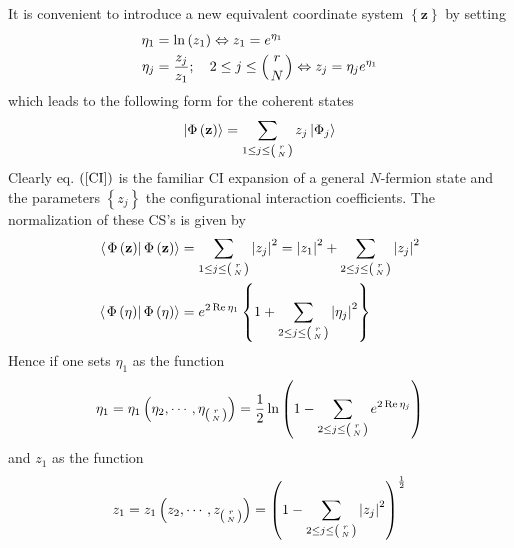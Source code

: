 \documentclass[aps,preprint]{revtex4}%
\begin{document}
It is convenient to introduce a new equivalent coordinate system $\left\{
\mathbf{z}\right\}  $ by setting
\begin{align}
\eta_{1}  &  =\ln\left(  z_{1}\right)  \Leftrightarrow z_{1}=e^{\eta_{1}}\\
\eta_{j}  &  =\frac{z_{j}}{z_{1}};\quad2\leq j\leq\left(
\genfrac{}{}{0pt}{}{r}{N}%
\right)  \Leftrightarrow z_{j}=\eta_{j}e^{\eta_{1}}%
\end{align}
which leads to the following form for the coherent states
\begin{equation}
\left\vert \Phi\left(  \mathbf{z}\right)  \right\rangle =\sum_{1\leq
j\leq\left(
\genfrac{}{}{0pt}{}{r}{N}%
\right)  }z_{j}\left\vert \Phi_{j}\right\rangle \label{CI}%
\end{equation}
Clearly eq. $\left(  \ref{CI}\right)  $ is the familiar CI expansion of a
general $N$-fermion state and the parameters $\left\{  z_{j}\right\}  $ the
configurational interaction coefficients. The normalization of these CS's is
given by
\begin{align}
\left\langle \left.  \Phi\left(  \mathbf{z}\right)  \right\vert \Phi\left(
\mathbf{z}\right)  \right\rangle  &  =\sum_{1\leq j\leq\left(
\genfrac{}{}{0pt}{}{r}{N}%
\right)  }\left\vert z_{j}\right\vert ^{2}=\left\vert z_{1}\right\vert
^{2}+\sum_{2\leq j\leq\left(
\genfrac{}{}{0pt}{}{r}{N}%
\right)  }\left\vert z_{j}\right\vert ^{2}\\
\left\langle \left.  \Phi\left(  \mathbf{\eta}\right)  \right\vert \Phi\left(
\mathbf{\eta}\right)  \right\rangle  &  =e^{2\operatorname{Re}\eta_{1}%
}\left\{  1+\sum_{2\leq j\leq\left(
\genfrac{}{}{0pt}{}{r}{N}%
\right)  }\left\vert \eta_{j}\right\vert ^{2}\right\}
\end{align}
Hence if one sets $\eta_{1}$ as the function
\begin{equation}
\eta_{1}=\eta_{1}\left(  \eta_{2},\cdots,\eta_{\left(
\genfrac{}{}{0pt}{}{r}{N}%
\right)  }\right)  =\frac{1}{2}\ln\left(  1-\sum_{2\leq j\leq\left(
\genfrac{}{}{0pt}{}{r}{N}%
\right)  }e^{2\operatorname{Re}\eta_{j}}\right)  \label{n1}%
\end{equation}
and $z_{1}$ as the function%
\begin{equation}
z_{1}=z_{1}\left(  z_{2},\cdots,z_{\left(
\genfrac{}{}{0pt}{}{r}{N}%
\right)  }\right)  =\left(  1-\sum_{2\leq j\leq\left(
\genfrac{}{}{0pt}{}{r}{N}%
\right)  }\left\vert z_{j}\right\vert ^{2}\right)  ^{\frac{1}{2}} \label{n2}%
\end{equation}
\end{document}
